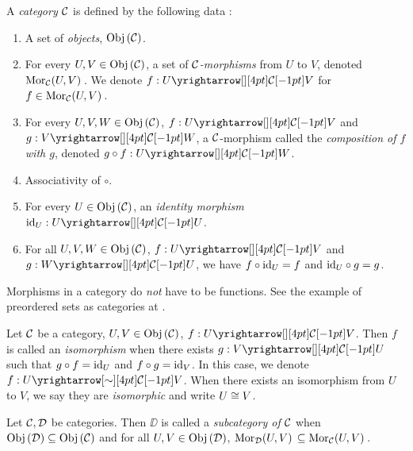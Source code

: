 \begin{dfn}[Categories]
  
  A \emph{category $\mathcal{C}$} is defined by the following data : 
  \begin{enumerate}
    \item A set of \emph{objects}, $\mathrm{Obj}\left(\mathcal{C}\right)$. 
    \item For every $U, V \in \mathrm{Obj}\left(\mathcal{C}\right)$, 
    a set of \emph{$\mathcal{C}$-morphisms} from $U$ to $V$,
    denoted $\mathrm{Mor}_{\mathcal{C}}(U, V)\,$.
    We denote $f : \map{U}{V}{\CC}{}$ for $f \in \mathrm{Mor}_{\mathcal{C}}(U, V)\,$. 
    \item For every $U, V, W \in \mathrm{Obj}\left(\mathcal{C}\right)$, 
    $f : \map{U}{V}{\CC}{}$ and $g : \map{V}{W}{\CC}{}$, 
    a $\mathcal{C}$-morphism called the \emph{composition of $f$ with $g$},
    denoted $g \circ f : \map{U}{W}{\CC}{}$.
    \item Associativity of $\circ$.
    \item For every $U \in \mathrm{Obj}\left(\mathcal{C}\right)$, 
    an \emph{identity morphism} $\id{U} : \map{U}{U}{\CC}{}$.
    \item For all $U, V, W \in \mathrm{Obj}\left(\mathcal{C}\right)$, 
    $f : \map{U}{V}{\CC}{}$ and $g : \map{W}{U}{\CC}{}$, 
    we have $f \circ \mathrm{id}_{U} = f$ and $\mathrm{id}_{U} \circ g = g$. 
  \end{enumerate}
\end{dfn}

\begin{rmk}
Morphisms in a category do \emph{not} have to be functions.
See the example of preordered sets as categories at
.
\end{rmk}

\begin{dfn}[Isomorphisms]
  
  Let $\mathcal{C}$ be a category, $U, V \in \mathrm{Obj}\left(\mathcal{C}\right)$, $f : \map{U}{V}{\CC}{}$.
  Then $f$ is called an \emph{isomorphism} when 
  there exists $g : \map{V}{U}{\CC}{}$ such that 
  $g \circ f = \mathrm{id}_{U}$ and $f \circ g = \mathrm{id}_{V}$.
  In this case, we denote $f : \map{U}{V}{\CC}{\sim}$.
  When there exists an isomorphism from $U$ to $V$, 
  we say they are \emph{isomorphic} and write $U \cong V$. 
\end{dfn}

\begin{dfn}[Subcategories]
  
  Let $\mathcal{C},\mathcal{D}$ be categories. 
  Then $\DD$ is called a \emph{subcategory of $\mathcal{C}$} when 
  $\mathrm{Obj}\left(\mathcal{D}\right) \subseteq \mathrm{Obj}\left(\mathcal{C}\right)$ and 
  for all $U,V \in \mathrm{Obj}\left(\mathcal{D}\right)$, $\mathrm{Mor}_{\mathcal{D}}(U, V)\, \subseteq \mathrm{Mor}_{\mathcal{C}}(U, V)\,$.
\end{dfn}

